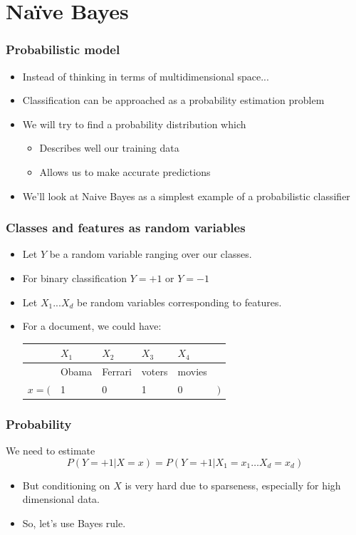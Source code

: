 \documentclass[14pt,mathserif]{beamer}
\begin{document}
\section{Na{\"i}ve Bayes}
\begin{frame}
  \frametitle{Probabilistic model}
  \begin{itemize}
  \item Instead of thinking in terms of multidimensional space...
  \item Classification can be approached as a probability estimation problem
  \item We will try to find a probability distribution which
    \begin{itemize}
    \item  Describes
    well our training data 
  \item Allows us  to make accurate predictions 
    \end{itemize}
  \item We'll look at Naive Bayes as a simplest example of a
    probabilistic classifier
  \end{itemize}
\end{frame}

\begin{frame}
  \frametitle{Classes and features as random variables}
  \begin{itemize}
  \item Let $Y$ be a random variable ranging over our classes. 
  \item For binary classification $Y=+1$ or $Y=-1$
  \item Let $X_1 ... X_d$ be random variables corresponding to
    features. 
  \item For a document, we could have:

    \begin{tabular}{rlllll}
          &    $X_1$& $X_2$   & $X_3$   & $X_4$   & \\\hline
          & Obama   & Ferrari & voters  & movies & \\\hline
$x = ($   & 1       & 0       & 1       & 0 & $)$\\
    \end{tabular}
  \end{itemize}
\end{frame}

\begin{frame}
  \frametitle{Probability}
  \begin{block}{}
We need to estimate 
\[
P(Y=+1|X=x) = P(Y=+1|X_1=x_1\ldots X_d=x_d) 
\]
\end{block}
\begin{itemize}
\item But conditioning on $X$ is very hard due to sparseness,
  especially for high dimensional data.
\item So, let's use Bayes rule.
\end{itemize}
\end{frame}
\end{document}
